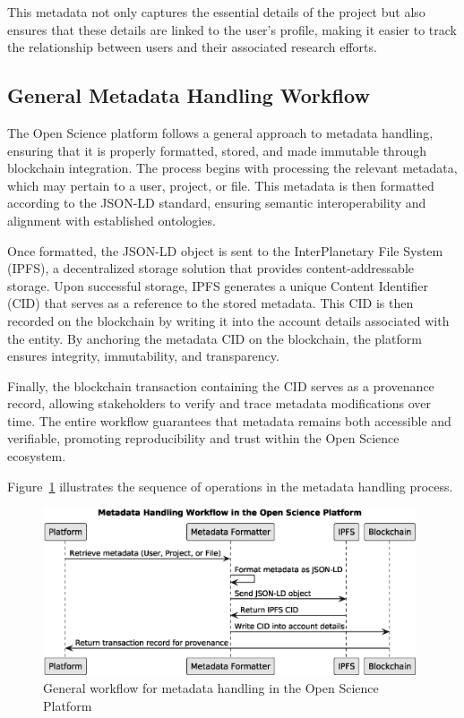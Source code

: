 \documentclass{article}
\begin{document}
This metadata not only captures the essential details of the project but also ensures that these details are linked to the user's profile, making it easier to track the relationship between users and their associated research efforts.


\subsection{General Metadata Handling Workflow}

The Open Science platform follows a general approach to metadata handling, ensuring that it is properly formatted, stored, and made immutable through blockchain integration. The process begins with processing the relevant metadata, which may pertain to a user, project, or file. This metadata is then formatted according to the JSON-LD standard, ensuring semantic interoperability and alignment with established ontologies.

Once formatted, the JSON-LD object is sent to the InterPlanetary File System (IPFS), a decentralized storage solution that provides content-addressable storage. Upon successful storage, IPFS generates a unique Content Identifier (CID) that serves as a reference to the stored metadata. This CID is then recorded on the blockchain by writing it into the account details associated with the entity. By anchoring the metadata CID on the blockchain, the platform ensures integrity, immutability, and transparency.

Finally, the blockchain transaction containing the CID serves as a provenance record, allowing stakeholders to verify and trace metadata modifications over time. The entire workflow guarantees that metadata remains both accessible and verifiable, promoting reproducibility and trust within the Open Science ecosystem.

Figure~\ref{fig:metadata_workflow} illustrates the sequence of operations in the metadata handling process.


\begin{figure}[htbp]
      \centering
      \includegraphics[width=0.98\textwidth, keepaspectratio]{metadata_workflow_sequence.eps}
      \caption{General workflow for metadata handling in the Open Science Platform}
      \label{fig:metadata_workflow}
\end{figure}
\end{document}
